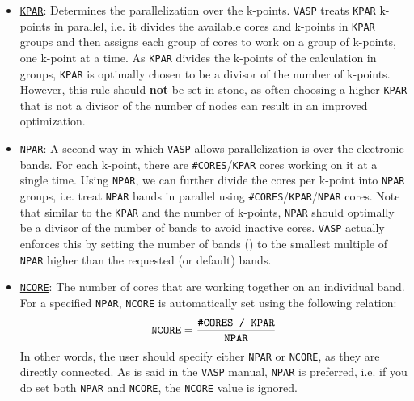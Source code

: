 \begin{refsection}
\begin{itemize}
\item \href{https://cms.mpi.univie.ac.at/wiki/index.php/KPAR}{\texttt{KPAR}}: Determines the parallelization over the k-points. \texttt{VASP} treats \texttt{KPAR} k-points in parallel, i.e. it divides the available cores and k-points in \texttt{KPAR} groups and then assigns each group of cores to work on a group of k-points, one k-point at a time. As \texttt{KPAR} divides the k-points of the calculation in groups, \texttt{KPAR} is optimally chosen to be a divisor of the number of k-points. However, this rule should \textbf{not} be set in stone, as often choosing a higher \texttt{KPAR} that is not a divisor of the number of nodes can result in an improved optimization. 

\item \href{https://cms.mpi.univie.ac.at/wiki/index.php/NPAR}{\texttt{NPAR}}: A second way in which \texttt{VASP} allows parallelization is over the electronic bands. For each k-point, there are \verb|#CORES|/\verb|KPAR| cores working on it at a single time. Using \verb|NPAR|, we can further divide the cores per k-point into \verb|NPAR| groups, i.e. treat \verb|NPAR| bands in parallel using \verb|#CORES|/\verb|KPAR|/\verb|NPAR| cores. Note that similar to the \verb|KPAR| and the number of k-points,  \verb|NPAR| should optimally be a divisor of the number of bands to avoid inactive cores. \texttt{VASP} actually enforces this by setting the number of bands () to the smallest multiple of \verb|NPAR| higher than the requested (or default) bands.

\item \href{https://cms.mpi.univie.ac.at/wiki/index.php/NCORE}{\texttt{NCORE}}: The number of cores that are working together on an individual band. For a specified \verb|NPAR|, \verb|NCORE| is automatically set using the following relation:
\begin{equation*}
\texttt{NCORE} = \frac{\texttt{\#CORES / \texttt{KPAR}}}{\texttt{NPAR}}
\end{equation*}
In other words, the user should specify either \verb|NPAR| or \verb|NCORE|, as they are directly connected. As is said in the \texttt{VASP} manual, \verb|NPAR| is preferred, i.e. if you do set both \verb|NPAR| and \verb|NCORE|, the \verb|NCORE| value is ignored.



\end{itemize}
\end{refsection}
